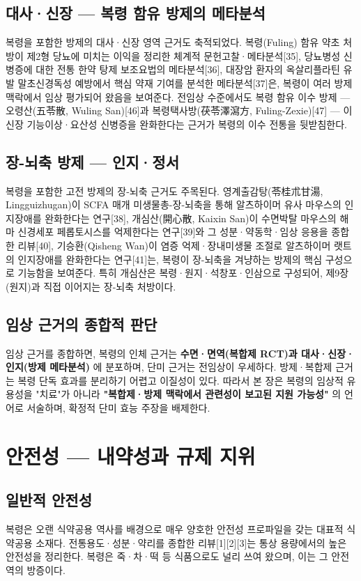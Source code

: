 \documentclass[11pt,oneside]{book}
\begin{document}
\subsection{대사·신장 — 복령 함유 방제의 메타분석}
복령을 포함한 방제의 대사·신장 영역 근거도 축적되었다. 복령(Fuling) 함유 약초 처방이 제2형 당뇨에 미치는 이익을 정리한 체계적 문헌고찰·메타분석[35], 당뇨병성 신병증에 대한 전통 한약 탕제 보조요법의 메타분석[36], 대장암 환자의 옥살리플라틴 유발 말초신경독성 예방에서 핵심 약재 기여를 분석한 메타분석[37]은, 복령이 여러 방제 맥락에서 임상 평가되어 왔음을 보여준다. 전임상 수준에서도 복령 함유 이수 방제 — 오령산(五苓散, Wuling San)[46]과 복령택사방(茯苓澤瀉方, Fuling-Zexie)[47] — 이 신장 기능이상·요산성 신병증을 완화한다는 근거가 복령의 이수 전통을 뒷받침한다.

\subsection{장-뇌축 방제 — 인지·정서}
복령을 포함한 고전 방제의 장-뇌축 근거도 주목된다. 영계출감탕(苓桂朮甘湯, Lingguizhugan)이 SCFA 매개 미생물총-장-뇌축을 통해 알츠하이머 유사 마우스의 인지장애를 완화한다는 연구[38], 개심산(開心散, Kaixin San)이 수면박탈 마우스의 해마 신경세포 페롭토시스를 억제한다는 연구[39]와 그 성분·약동학·임상 응용을 종합한 리뷰[40], 기승환(Qisheng Wan)이 염증 억제·장내미생물 조절로 알츠하이머 랫트의 인지장애를 완화한다는 연구[41]는, 복령이 장-뇌축을 겨냥하는 방제의 핵심 구성으로 기능함을 보여준다. 특히 개심산은 복령·원지·석창포·인삼으로 구성되어, 제9장(원지)과 직접 이어지는 장-뇌축 처방이다.

\subsection{임상 근거의 종합적 판단}
임상 근거를 종합하면, 복령의 인체 근거는 \textbf{수면·면역(복합제 RCT)과 대사·신장·인지(방제 메타분석)} 에 분포하며, 단미 근거는 전임상이 우세하다. 방제·복합제 근거는 복령 단독 효과를 분리하기 어렵고 이질성이 있다. 따라서 본 장은 복령의 임상적 유용성을 "치료"가 아니라 \textbf{"복합제·방제 맥락에서 관련성이 보고된 지원 가능성"} 의 언어로 서술하며, 확정적 단미 효능 주장을 배제한다.

\section{안전성 — 내약성과 규제 지위}
\subsection{일반적 안전성}
복령은 오랜 식약공용 역사를 배경으로 매우 양호한 안전성 프로파일을 갖는 대표적 식약공용 소재다. 전통용도·성분·약리를 종합한 리뷰[1][2][3]는 통상 용량에서의 높은 안전성을 정리한다. 복령은 죽·차·떡 등 식품으로도 널리 쓰여 왔으며, 이는 그 안전역의 방증이다.
\end{document}
